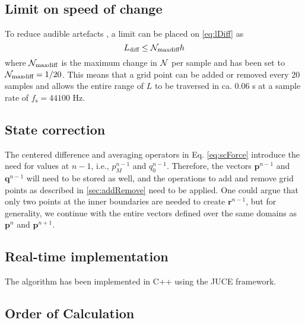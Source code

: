 \subsection{Limit on speed of change}
To reduce audible artefacts \SWcomment[explain], a limit can be placed on \eqref{eq:lDiff} as
\begin{equation}  
    L_\text{diff} \leq \mathcal{N}_\text{maxdiff} h
\end{equation}
where $\mathcal{N}_\text{maxdiff}$ is the maximum change in $\mathcal{N}$ per sample and has been set to $\mathcal{N}_\text{maxdiff} = 1/20$. This means that a grid point can be added or removed every 20 samples and allows the entire range of $L$ to be traversed in ca. 0.06 s at a sample rate of $f_\text{s} = 44100$ Hz. 

\subsection{State correction}
The centered difference and averaging operators in Eq. \eqref{eq:scForce} introduce the need for values at $n-1$, i.e., $p_{M}^{n-1}$ and $q_{0}^{n-1}$. Therefore, the vectors $\mathbf{p}^{n-1}$ and $\mathbf{q}^{n-1}$ will need to be stored as well, and the operations to add and remove grid points as described in \ref{sec:addRemove} need to be applied. One could argue that only two points at the inner boundaries are needed to create $\mathbf{r}^{n-1}$, but for generality, we continue with the entire vectors defined over the same domains as $\mathbf{p}^n$ and $\mathbf{p}^{n+1}$. 


\subsection{Real-time implementation}
The algorithm has been implemented in C++ using the JUCE framework. 

\subsection{Order of Calculation}

